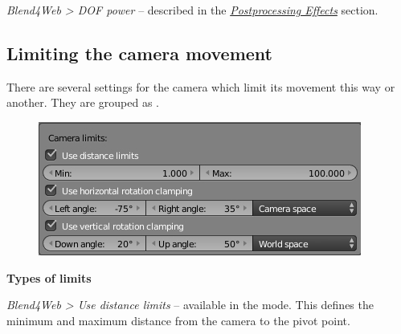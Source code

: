 \documentclass[a4paper,12pt,oneside]{sphinxmanual}
\begin{document}
\emph{Blend4Web \textgreater{} DOF power} -- described in the {\hyperref[postprocessing_effects:postprocessing-effects]{\emph{Postprocessing Effects}}} section.


\subsection{Limiting the camera movement}
\label{objects:id6}
There are several settings for the camera which limit its movement this way or another. They are grouped as .
\begin{figure}[htbp]
\centering

\includegraphics{camera_limits.jpg}
\end{figure}

\begin{DUlineblock}{0em}
\item[] 
\end{DUlineblock}

\textbf{Types of limits}

\emph{Blend4Web \textgreater{} Use distance limits} -- available in the  mode. This defines the minimum and maximum distance from the camera to the pivot point.
\end{document}
